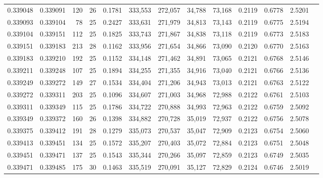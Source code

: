 \begin{tabular}{rrrrrrrrrrrrr}
0.339048 & 0.339091 &   120 &  26 &                                     0.1781 & 333,553 & 272,057 &  34,788 &  73,168 & 0.2119 & 0.6778 & 2.5201 \\
0.339093 & 0.339104 &    78 &  25 &                                     0.2427 & 333,631 & 271,979 &  34,813 &  73,143 & 0.2119 & 0.6775 & 2.5194 \\
0.339104 & 0.339151 &   112 &  25 &                                     0.1825 & 333,743 & 271,867 &  34,838 &  73,118 & 0.2119 & 0.6773 & 2.5183 \\
0.339151 & 0.339183 &   213 &  28 &                                     0.1162 & 333,956 & 271,654 &  34,866 &  73,090 & 0.2120 & 0.6770 & 2.5163 \\
0.339183 & 0.339210 &   192 &  25 &                                     0.1152 & 334,148 & 271,462 &  34,891 &  73,065 & 0.2121 & 0.6768 & 2.5146 \\
0.339211 & 0.339248 &   107 &  25 &                                     0.1894 & 334,255 & 271,355 &  34,916 &  73,040 & 0.2121 & 0.6766 & 2.5136 \\
0.339249 & 0.339272 &   149 &  27 &                                     0.1534 & 334,404 & 271,206 &  34,943 &  73,013 & 0.2121 & 0.6763 & 2.5122 \\
0.339272 & 0.339311 &   203 &  25 &                                     0.1096 & 334,607 & 271,003 &  34,968 &  72,988 & 0.2122 & 0.6761 & 2.5103 \\
0.339311 & 0.339349 &   115 &  25 &                                     0.1786 & 334,722 & 270,888 &  34,993 &  72,963 & 0.2122 & 0.6759 & 2.5092 \\
0.339349 & 0.339372 &   160 &  26 &                                     0.1398 & 334,882 & 270,728 &  35,019 &  72,937 & 0.2122 & 0.6756 & 2.5078 \\
0.339375 & 0.339412 &   191 &  28 &                                     0.1279 & 335,073 & 270,537 &  35,047 &  72,909 & 0.2123 & 0.6754 & 2.5060 \\
0.339413 & 0.339451 &   134 &  25 &                                     0.1572 & 335,207 & 270,403 &  35,072 &  72,884 & 0.2123 & 0.6751 & 2.5048 \\
0.339451 & 0.339471 &   137 &  25 &                                     0.1543 & 335,344 & 270,266 &  35,097 &  72,859 & 0.2123 & 0.6749 & 2.5035 \\
0.339471 & 0.339485 &   175 &  30 &                                     0.1463 & 335,519 & 270,091 &  35,127 &  72,829 & 0.2124 & 0.6746 & 2.5019 \\

\end{tabular}
